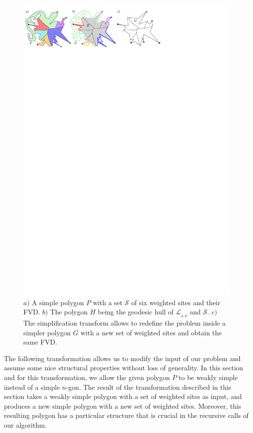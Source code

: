 \documentclass[a4paper,UKenglish]{socg-lipics-v2018}
\newcommand{\s}{\mathcal S}
\newcommand{\LL}[1][\s, P]{\ensuremath{\mathcal L_{_{#1}}}}
\begin{document}
\begin{figure}[t]
\centering
\includegraphics{imgSimplification.pdf}
\caption{$a)$ A simple polygon $P$ with a set $\s$ of six weighted sites and their FVD. $b)$ The polygon $H$ being the geodesic hull of $\LL$ and $\s$.
$c)$ The simplification transform allows to redefine the problem inside a simpler polygon $G$ with a new set of weighted sites and obtain the same FVD.}
\label{fig:FVD}
\end{figure}

The following transformation allows us to modify the input of our problem and assume some nice structural properties without loss of generality.
In this section and for this transformation, we allow the given polygon $P$ to be weakly simple instead of a simple $n$-gon. 
The result of the transformation described in this section takes a weakly simple polygon with a set of weighted sites as input, and produces a new simple polygon with a new set of weighted sites. Moreover, this resulting polygon has a particular structure that is crucial in the recursive calls of our algorithm.
\end{document}
